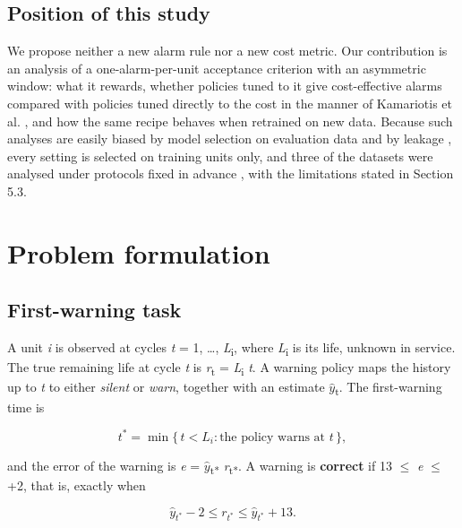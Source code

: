 \documentclass[a4paper,fleqn,doubleblind]{cas-dc}
\begin{document}
\subsection{Position of this study}

We propose neither a new alarm rule nor a new cost metric. Our contribution is an analysis of a one-alarm-per-unit acceptance criterion with an asymmetric window: what it rewards, whether policies tuned to it give cost-effective alarms compared with policies tuned directly to the cost in the manner of Kamariotis et al. \cite{kamariotis2024}, and how the same recipe behaves when retrained on new data. Because such analyses are easily biased by model selection on evaluation data \cite{varma2006} and by leakage \cite{kapoor2023}, every setting is selected on training units only, and three of the datasets were analysed under protocols fixed in advance \cite{nosek2018}, with the limitations stated in Section 5.3.

\section{Problem formulation}\label{sec:3}

\subsection{First-warning task}

A unit \textit{i} is observed at cycles \textit{t} = 1, \ldots{}, \textit{L}\textsubscript{i}, where \textit{L}\textsubscript{i} is its life, unknown in service. The true remaining life at cycle \textit{t} is \textit{r}\textsubscript{t} = \textit{L}\textsubscript{i} \textminus{} \textit{t}. A warning policy maps the history up to \textit{t} to either \textit{silent} or \textit{warn}, together with an estimate $\hat{y}$\textsubscript{t}. The first-warning time is

\begin{equation}
t^{*} = \min\{\, t < L_i : \text{the policy warns at } t \,\},
\end{equation}

and the error of the warning is \textit{e} = $\hat{y}$\textsubscript{t*} \textminus{} \textit{r}\textsubscript{t*}. A warning is \textbf{correct} if \textminus{}13 $\le$ \textit{e} $\le$ +2, that is, exactly when

\begin{equation}
\hat{y}_{t^*} - 2 \le r_{t^*} \le \hat{y}_{t^*} + 13.
\end{equation}
\end{document}

